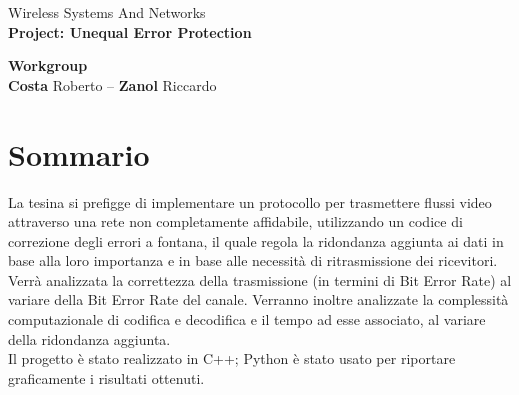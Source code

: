 \documentclass[italian, a4paper, 12pt]{article}
\newcommand{\horline}{\rule{1\linewidth}{0.9pt}}
\begin{document}
\begin{center}
        \Large Wireless Systems And Networks\\
        \huge \textbf{Project: Unequal Error Protection}\\[3mm]
        \begin{framed}
                \Large \textbf{Workgroup} \\[2mm]
                \normalsize \textbf{Costa} Roberto -- \textbf{Zanol} Riccardo
        \end{framed}
\end{center}
\FloatBarrier
\section*{Sommario} %
La tesina si prefigge di implementare un protocollo per trasmettere flussi video attraverso una rete non completamente affidabile, utilizzando un codice di correzione degli errori a fontana, il quale regola la ridondanza aggiunta ai dati in base alla loro importanza e in base alle necessità di ritrasmissione dei ricevitori.
Verrà analizzata la correttezza della trasmissione (in termini di Bit Error Rate) al variare della Bit Error Rate del canale. Verranno inoltre analizzate la complessità computazionale di codifica e decodifica e il tempo ad esse associato, al variare della ridondanza aggiunta.\\
Il progetto è stato realizzato in C++; Python è stato usato per riportare graficamente i risultati ottenuti.
\newpage
\end{document}

